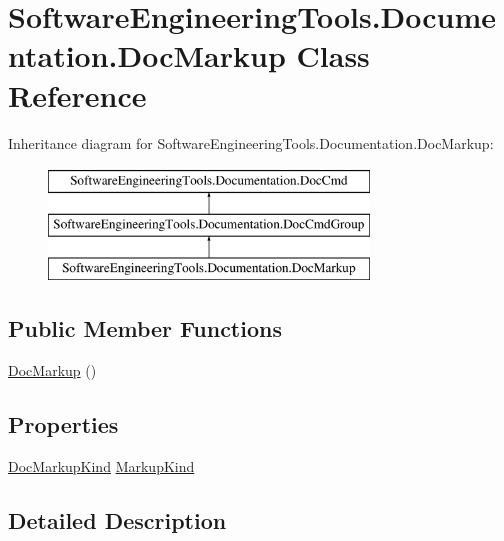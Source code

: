 \hypertarget{class_software_engineering_tools_1_1_documentation_1_1_doc_markup}{\section{Software\+Engineering\+Tools.\+Documentation.\+Doc\+Markup Class Reference}
\label{class_software_engineering_tools_1_1_documentation_1_1_doc_markup}
}
Inheritance diagram for Software\+Engineering\+Tools.\+Documentation.\+Doc\+Markup\+:\begin{figure}[H]
\begin{center}
\leavevmode
\includegraphics[height=3.000000cm]{class_software_engineering_tools_1_1_documentation_1_1_doc_markup}
\end{center}
\end{figure}
\subsection*{Public Member Functions}
\begin{DoxyCompactItemize}
\item 
\hyperlink{class_software_engineering_tools_1_1_documentation_1_1_doc_markup_a061378317e6be3bffeaf80970acb88f0}{Doc\+Markup} ()
\end{DoxyCompactItemize}
\subsection*{Properties}
\begin{DoxyCompactItemize}
\item 
\hyperlink{namespace_software_engineering_tools_1_1_documentation_aa3643086f24cd1d8ba619a3b0dbb183f}{Doc\+Markup\+Kind} \hyperlink{class_software_engineering_tools_1_1_documentation_1_1_doc_markup_aba8537f35f564d8ad7375e2bb736544d}{Markup\+Kind}
\end{DoxyCompactItemize}


\subsection{Detailed Description}


